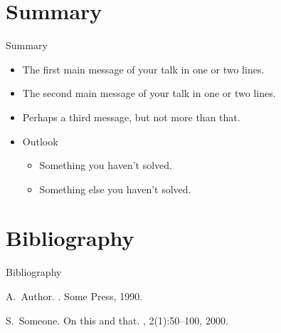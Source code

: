 \documentclass[xcolor=dvipsnames,professionalfonts,ignorenonframetext,aspectratio=169,10pt]{beamer}
\begin{document}
\section*{Summary}

\begin{frame}{Summary}
  \begin{itemize}
  \item
    The \alert{first main message} of your talk in one or two lines.
  \item
    The \alert{second main message} of your talk in one or two lines.
  \item
    Perhaps a \alert{third message}, but not more than that.
  \end{itemize}
  
  \begin{itemize}
  \item
    Outlook
    \begin{itemize}
    \item
      Something you haven't solved.
    \item
      Something else you haven't solved.
    \end{itemize}
  \end{itemize}
\end{frame}

\section*{Bibliography}
\begin{frame}{Bibliography}
  \begin{thebibliography}{10}

    A.~Author.
    .
    \newblock Some Press, 1990.

    S.~Someone.
    \newblock On this and that.
    , 2(1):50--100,
    2000.

  \end{thebibliography}
\end{frame}
\end{document}
